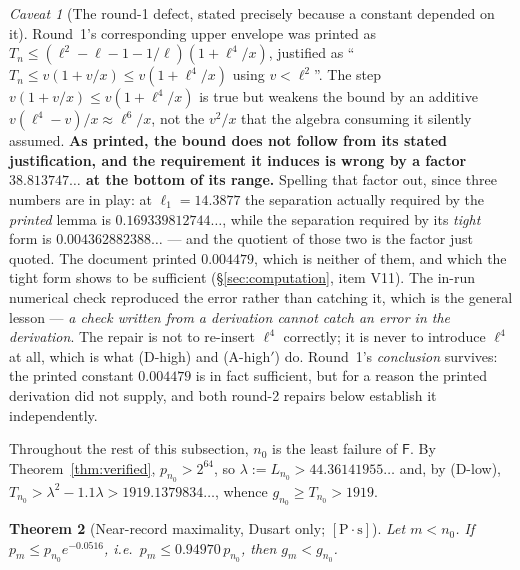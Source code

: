\documentclass[11pt,a4paper]{article}
\theoremstyle{plain}
\newtheorem{theorem}{Theorem}[section]
\theoremstyle{definition}
\theoremstyle{remark}
\newtheorem{hazard}[theorem]{Caveat}
\newcommand{\cPs}{{[\mathrm{P}\!\cdot\!\mathrm{s}]}}
\newcommand{\Fb}{\mathsf{F}}
\begin{document}
\begin{hazard}[The round-1 defect, stated precisely because a constant depended on it]
\label{haz:F2}
Round~1's corresponding upper envelope was printed as
$T_n \le (\ell^2 - \ell - 1 - 1/\ell)(1 + \ell^4/x)$, justified as
``$T_n \le v(1+v/x) \le v(1 + \ell^4/x)$ using $v < \ell^2$''. The step
$v(1+v/x) \le v(1+\ell^4/x)$ is true but weakens the bound by an additive
$v(\ell^4 - v)/x \approx \ell^6/x$, not the $v^2/x$ that the algebra consuming it silently
assumed. \textbf{As printed, the bound does not follow from its stated justification, and the requirement
it induces is wrong by a factor $38.813747\ldots$ at the bottom of its range.} Spelling that
factor out, since three numbers are in play: at $\ell_1 = 14.3877$ the separation actually
required by the \emph{printed} lemma is $0.169339812744\ldots$, while the separation required by
its \emph{tight} form is $0.004362882388\ldots$ --- and the quotient of those two is the factor
just quoted. The document printed $0.004479$, which is neither of them, and which the tight form
shows to be sufficient (\S\ref{sec:computation}, item V11). The
in-run numerical check reproduced the error rather than catching it, which is the general
lesson --- \emph{a check written from a derivation cannot catch an error in the derivation}.
The repair is not to re-insert $\ell^4$ correctly; it is never to introduce $\ell^4$ at all,
which is what (D-high) and (A-high$'$) do. Round~1's \emph{conclusion} survives: the printed
constant $0.004479$ is in fact sufficient, but for a reason the printed derivation did not
supply, and both round-2 repairs below establish it independently.
\end{hazard}

Throughout the rest of this subsection, $n_0$ is the least failure of $\Fb$. By
Theorem~\ref{thm:verified}, $p_{n_0} > 2^{64}$, so $\lambda := L_{n_0} > 44.36141955\ldots$
and, by (D-low), $T_{n_0} > \lambda^2 - 1.1\lambda > 1919.1379834\ldots$, whence
$g_{n_0} \ge T_{n_0} > 1919$.

\begin{theorem}[Near-record maximality, Dusart only; $\cPs$]
\label{thm:Ca}
Let $m < n_0$. If $p_m \le p_{n_0}e^{-0.0516}$, i.e.\ $p_m \le 0.94970\,p_{n_0}$, then
$g_m < g_{n_0}$.
\end{theorem}
\end{document}
